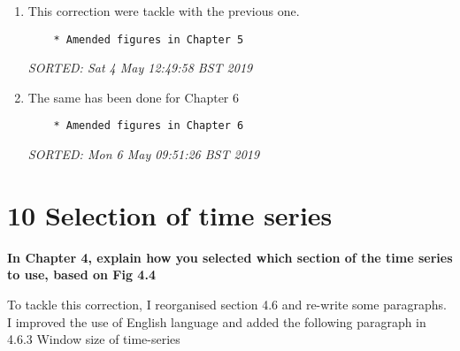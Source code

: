 \documentclass[12pt]{article}
\begin{document}
\begin{enumerate}

\item  This correction were tackle with the previous one.

	\begin{verbatim}
	* Amended figures in Chapter 5	
	\end{verbatim}
	\textit{
	SORTED:  Sat  4 May 12:49:58 BST 2019
	}
	\\

\item  The same has been done for Chapter 6

	\begin{verbatim}
	* Amended figures in Chapter 6
	\end{verbatim}
	\textit{
	SORTED:  Mon  6 May 09:51:26 BST 2019
	}
	\\




\end{enumerate}




\section*{10 Selection of time series}
\textbf{
In Chapter 4, explain how you selected which 
section of the time series to use, based on Fig 4.4
}

	To tackle this correction, 
	I reorganised section 4.6 and re-write some paragraphs.
	I improved the use of English language and
	added the following paragraph 
	in 4.6.3 Window size of time-series 
 
\end{document}
